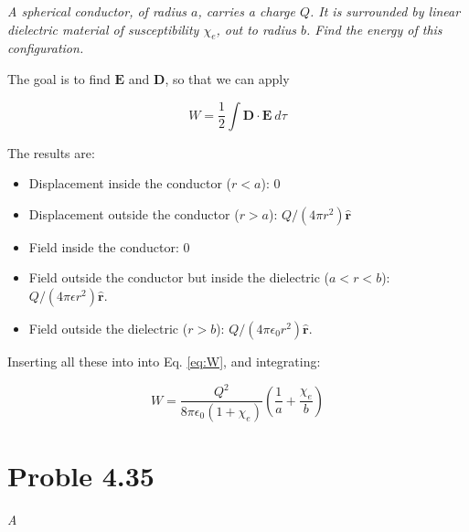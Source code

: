 \documentclass[10pt]{article}
\begin{document}
\textit{A spherical conductor, of radius $a$, carries a charge $Q$.  It is surrounded by linear dielectric material of susceptibility $\chi_e$, out to radius $b$.  Find the energy of this configuration.}

The goal is to find $\mathbf{E}$ and $\mathbf{D}$, so that we can apply

\begin{equation}
W = \frac{1}{2}\int \mathbf{D} \cdot \mathbf{E} ~ d\tau \label{eq:W}
\end{equation}

The results are:

\begin{itemize}
\item Displacement inside the conductor ($r<a$): 0
\item Displacement outside the conductor ($r>a$): $Q/(4\pi r^2)\hat{\mathbf{r}}$
\item Field inside the conductor: 0
\item Field outside the conductor but inside the dielectric ($a<r<b$): $Q/(4\pi\epsilon r^2)\hat{\mathbf{r}}$.
\item Field outside the dielectric ($r>b$): $Q/(4\pi\epsilon_0 r^2)\hat{\mathbf{r}}$.
\end{itemize}

Inserting all these into into Eq. \ref{eq:W}, and integrating:

\begin{equation}
W = \frac{Q^2}{8\pi\epsilon_0(1+\chi_e)}\left( \frac{1}{a}+\frac{\chi_e}{b}\right)
\end{equation}

\section{Proble 4.35}

\textit{A}
\end{document}
